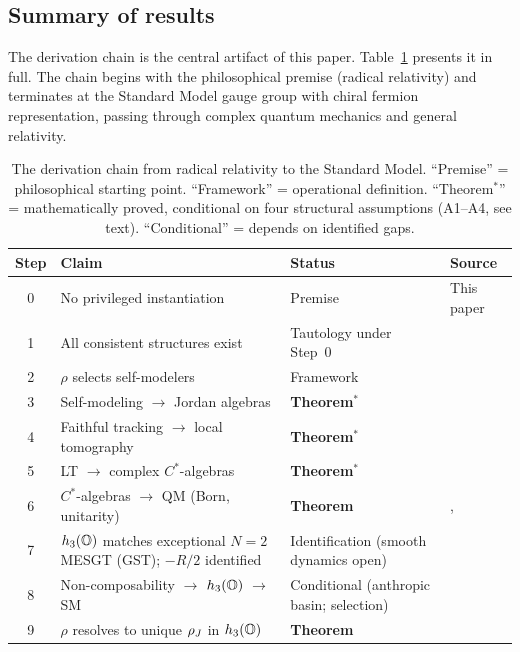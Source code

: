 \subsection{Summary of results}
\label{subsec:summary}

The derivation chain is the central artifact of this paper.
Table~\ref{tab:chain} presents it in full.  The chain begins with the
philosophical premise (radical relativity) and terminates at the
Standard Model gauge group with chiral fermion representation,
passing through complex quantum mechanics and general relativity.

\begin{table}[t]
\centering
\caption{The derivation chain from radical relativity to the Standard
  Model.  ``Premise'' = philosophical starting point.  ``Framework'' =
  operational definition.  ``Theorem$^*$'' = mathematically proved,
  conditional on four structural assumptions (A1--A4, see text).
  ``Conditional'' = depends on identified gaps.}
\label{tab:chain}
\small
\begin{tabular}{@{}cp{4.5cm}p{3cm}p{3.5cm}@{}}
\toprule
Step & Claim & Status & Source \\
\midrule
0 & No privileged instantiation & Premise & This paper \\
1 & All consistent structures exist & Tautology under Step~0
  & \citet{tegmark2008} \\
2 & $\rho$ selects self-modelers & Framework
  & \citet{ehrlich2026measure} \\
3 & Self-modeling $\to$ Jordan algebras & \textbf{Theorem$^*$}
  & \citet{ehrlich2026qm} \\
4 & Faithful tracking $\to$ local tomography & \textbf{Theorem$^*$}
  & \citet{ehrlich2026qm} \\
5 & LT $\to$ complex $C^*$-algebras
  & \textbf{Theorem$^*$} & \citet{ehrlich2026qm} \\
6 & $C^*$-algebras $\to$ QM (Born, unitarity)
  & \textbf{Theorem}
  & \citet{gleason1957}, \citet{barandes2025} \\
7 & $h_3(\mathbb{O})$ matches exceptional $N{=}2$ MESGT (GST); $-R/2$ identified
  & Identification (smooth dynamics open)
  & \citet{ehrlich2026gr} \\
8 & Non-composability $\to$ $h_3(\mathbb{O})$ $\to$ SM
  & Conditional (anthropic basin; selection)
  & \citet{ehrlich2026sm} \\
9 & $\rho$ resolves to unique $\rho_J$ in $h_3(\mathbb{O})$
  & \textbf{Theorem}
  & \citet{ehrlich2026measure} \\
\bottomrule
\end{tabular}
\end{table}

